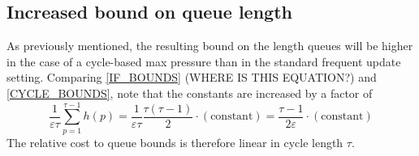%
%
%
%



\subsection*{Increased bound on queue length}
As previously mentioned, the resulting bound on the length queues will be higher in the case of a cycle-based max pressure than in the standard frequent update setting. 
{\color{red} Comparing \eqref{IF_BOUNDS} (WHERE IS THIS EQUATION?) and \eqref{CYCLE_BOUNDS}, note that the constants are increased by a factor of} 
\begin{equation}
\dfrac{1}{\varepsilon \tau} \sum_{p=1}^{\tau - 1} h(p) = \dfrac{1}{\varepsilon \tau}  \dfrac{\tau(\tau - 1)}{2}\cdot(\text{constant}) = \dfrac{\tau - 1}{2\varepsilon} \cdot(\text{constant})
\end{equation}
The relative cost to queue bounds is therefore linear in cycle length $\tau$. 












